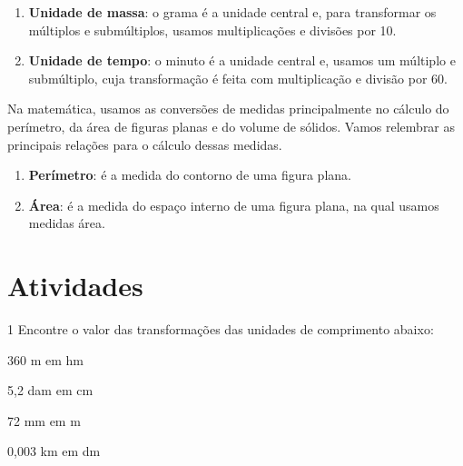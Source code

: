 {\begin{enumerate}
\item \textbf{Unidade de massa}: o grama é a unidade central e, para transformar
os múltiplos e submúltiplos, usamos multiplicações e divisões por 10.

\item \textbf{Unidade de tempo}: o minuto é a unidade central e, usamos um
múltiplo e submúltiplo, cuja transformação é feita com multiplicação e
divisão por 60.

\end{enumerate}


Na matemática, usamos as conversões de medidas principalmente no cálculo
do perímetro, da área de figuras planas e do volume de sólidos. Vamos
relembrar as principais relações para o cálculo dessas medidas.

\begin{enumerate}
\item \textbf{Perímetro}: é a medida do contorno de uma figura plana.
\item \textbf{Área}: é a medida do espaço interno de uma figura plana,
na qual usamos medidas área.
\end{enumerate}
}



\section*{Atividades}

\num{1} Encontre o valor das transformações das unidades de comprimento
abaixo:

\begin{escolha}[itemsep=0pt]

\item 360 m em hm 

\item 5,2 dam em cm 

\item 72 mm em m 

\item 0,003 km em dm 

\end{escolha}


